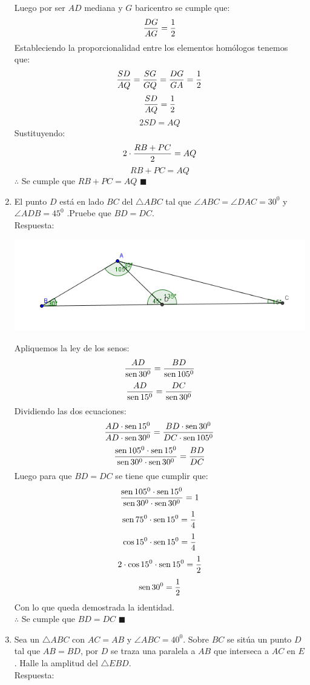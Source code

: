 \documentclass{book}
\newcommand{\sen}{\mathop{\rm sen}\nolimits} %
\begin{document}
\begin{enumerate}
        Luego por ser $AD$ mediana y $G$ baricentro se cumple que:
        $${DG\over AG}={1\over 2}$$
        Estableciendo la proporcionalidad entre los elementos homólogos tenemos que:
        $${SD\over AQ}={SG\over GQ}={DG\over GA}={1\over 2}$$
        $${SD\over AQ}={1\over 2}$$
        $$2SD=AQ$$
        Sustituyendo:
        $$2\cdot{RB+PC\over 2}=AQ$$
        $$RB+PC=AQ$$
        $\therefore$ Se cumple que $RB+PC=AQ$ $\blacksquare$\\
        \item El punto $D$ está en lado $BC$ del $\triangle ABC$ tal que $\angle ABC = \angle DAC = 30^0$  y $ \angle ADB = 45^0$  .Pruebe que  $BD = DC$. \\
        Respuesta:
        \begin{center}
            \includegraphics[scale=1]{imagenes/Geometria/6.png}
        \end{center}
        Apliquemos la ley de los senos:
        $$\frac{AD}{\sen{30^0}} =\frac{BD}{\sen{105^0} } $$
        $$\frac{AD}{\sen{15^0}} =\frac{DC}{\sen{30^0} }$$
        Dividiendo las dos ecuaciones:
        $$\frac{AD\cdot\sen{15^0}}{AD\cdot\sen{30^0}}=\frac{BD\cdot\sen{30^0}}{DC\cdot\sen{105^0} } $$
        $$\frac{\sen{105^0}\cdot\sen{15^0}}{\sen{30^0}\cdot\sen{30^0}}=\frac{BD}{DC} $$
        Luego para que $BD= DC$ se tiene que cumplir que:
        $$\frac{\sen{105^0}\cdot\sen{15^0}}{\sen{30^0}\cdot\sen{30^0}}=1 $$
        $$\sen{75^0}\cdot\sen{15^0}={1\over 4}$$
        $$\cos{15^0}\cdot\sen{15^0}={1\over 4}$$
        $$2\cdot\cos{15^0}\cdot\sen{15^0}={1\over 2}$$
        $$\sen{30^0}={1\over 2}$$
        Con lo que queda demostrada la identidad.\\
        $\therefore$ Se cumple que $BD= DC$ $\blacksquare$\\
        \item Sea un $\triangle ABC$ con $AC=AB$ y $\angle ABC = 40^0$. Sobre $BC$ se sitúa un punto $D$ tal que $AB=BD$, por $D$ se traza una paralela a $AB$ que interseca a $AC$ en $E$. Halle la amplitud del $\triangle EBD$.\\
        Respuesta:
        \begin{center}

\end{center}
\end{enumerate}
\end{document}
